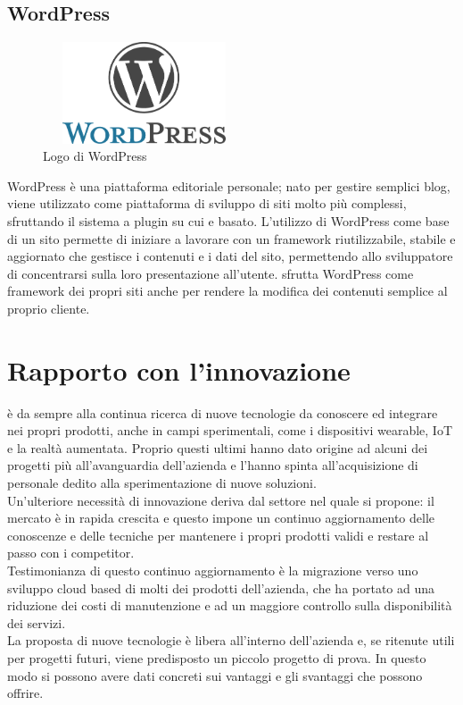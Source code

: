    \subsection{WordPress}
   \begin{figure}[H]
      \begin{center}
         \includegraphics[width=6cm,height=3cm,keepaspectratio]{immagini/wordpress-logo}
      \end{center}
      \caption{Logo di WordPress}\label{logowordpress}
   \end{figure}
   WordPress è una piattaforma editoriale personale; nato per gestire semplici blog, viene utilizzato come piattaforma di sviluppo di siti molto più complessi, sfruttando il sistema a plugin su cui e basato. L'utilizzo di WordPress come base di un sito permette di iniziare a lavorare con un framework riutilizzabile, stabile e aggiornato che gestisce i contenuti e i dati del sito, permettendo allo sviluppatore di concentrarsi sulla loro presentazione all'utente.
   \nomeAzienda{} sfrutta WordPress come framework dei propri siti anche per rendere la modifica dei contenuti semplice al proprio cliente.

\section{Rapporto con l'innovazione}
\nomeAzienda{} è da sempre alla continua ricerca di nuove tecnologie da conoscere ed integrare nei propri prodotti, anche in campi sperimentali, come i dispositivi \gls{wearable}, \gls{IoT} e la realtà aumentata. Proprio questi ultimi hanno dato origine ad alcuni dei progetti più all'avanguardia dell'azienda e l'hanno spinta all'acquisizione di personale dedito alla sperimentazione di nuove soluzioni.
\\
Un'ulteriore necessità di innovazione deriva dal settore nel quale \nomeAzienda{} si propone: il mercato è in rapida crescita e questo impone un continuo aggiornamento delle conoscenze e delle tecniche per mantenere i propri prodotti validi e restare al passo con i competitor.
\\
Testimonianza di questo continuo aggiornamento è la migrazione verso uno sviluppo cloud based di molti dei prodotti dell'azienda, che ha portato ad una riduzione dei costi di manutenzione e ad un maggiore controllo sulla disponibilità dei servizi.
\\
La proposta di nuove tecnologie è libera all'interno dell'azienda e, se ritenute utili per progetti futuri, viene predisposto un piccolo progetto di prova. In questo modo si possono avere dati concreti sui vantaggi e gli svantaggi che possono offrire.
